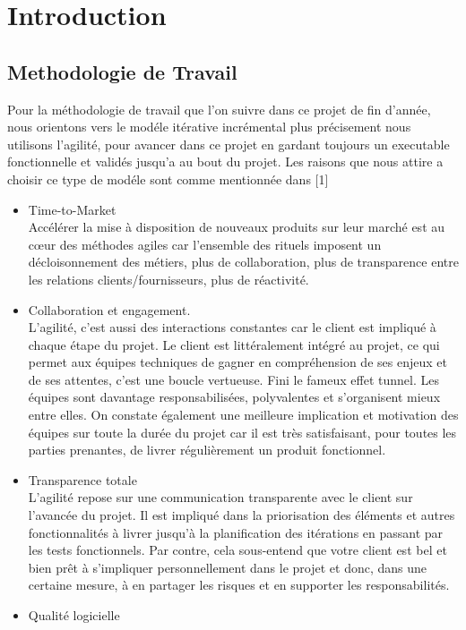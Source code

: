 \documentclass{book}
\begin{document}
\chapter{Introduction}

\section*{Methodologie de Travail}

Pour la méthodologie de travail que l'on suivre dans ce projet de fin d'année, nous orientons vers le modéle itérative incrémental plus précisement nous utilisons l'agilité, pour avancer dans ce projet en gardant toujours un executable fonctionnelle et validés jusqu'a au bout du projet.
Les raisons que nous attire a choisir ce type de modéle sont comme mentionnée dans [1]
\begin{itemize}
  \item Time-to-Market
\\Accélérer la mise à disposition de nouveaux produits sur leur marché est au cœur des méthodes agiles car l’ensemble des rituels imposent un décloisonnement des métiers, plus de collaboration, plus de transparence entre les relations clients/fournisseurs, plus de réactivité.
  \item Collaboration et engagement.
  \\L’agilité, c’est aussi des interactions constantes car le client est impliqué à chaque étape du projet. Le client est littéralement intégré au projet, ce qui permet aux équipes techniques de gagner en compréhension de ses enjeux et de ses attentes, c’est une boucle vertueuse. Fini le fameux effet tunnel. Les équipes sont davantage responsabilisées, polyvalentes et s’organisent mieux entre elles. On constate également une meilleure implication et motivation des équipes sur toute la durée du projet car il est très satisfaisant, pour toutes les parties prenantes, de livrer régulièrement un produit fonctionnel.
  \item Transparence totale
  \\L’agilité repose sur une communication transparente avec le client sur l’avancée du projet. Il est impliqué dans la priorisation des éléments et autres fonctionnalités à livrer jusqu’à la planification des itérations en passant par les tests fonctionnels. Par contre, cela sous-entend que votre client est bel et bien prêt à s’impliquer personnellement dans le projet et donc, dans une certaine mesure, à en partager les risques et en supporter les responsabilités.
  \item Qualité logicielle

\end{itemize}
\end{document}
